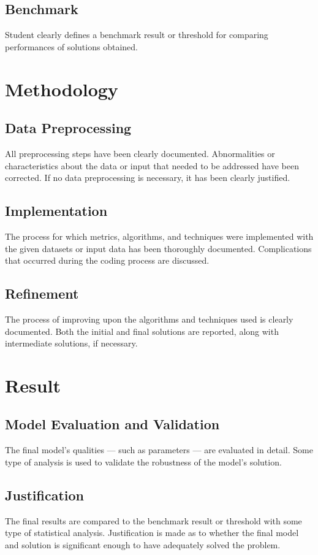 \documentclass[a4paper,10pt,fleqn]{article}
\begin{document}
\subsection{Benchmark}
Student clearly defines a benchmark result or threshold for comparing performances of solutions obtained.


\section{Methodology}
\subsection{Data Preprocessing}
All preprocessing steps have been clearly documented. Abnormalities or characteristics about the data or input that needed to be addressed have been corrected. If no data preprocessing is necessary, it has been clearly justified.


\subsection{Implementation}
The process for which metrics, algorithms, and techniques were implemented with the given datasets or input data has been thoroughly documented. Complications that occurred during the coding process are discussed.

\subsection{Refinement}
The process of improving upon the algorithms and techniques used is clearly documented. Both the initial and final solutions are reported, along with intermediate solutions, if necessary.



\section{Result}
\subsection{Model Evaluation and Validation}
The final model’s qualities — such as parameters — are evaluated in detail. Some type of analysis is used to validate the robustness of the model’s solution.

\subsection{Justification}
The final results are compared to the benchmark result or threshold with some type of statistical analysis. Justification is made as to whether the final model and solution is significant enough to have adequately solved the problem.
\end{document}
